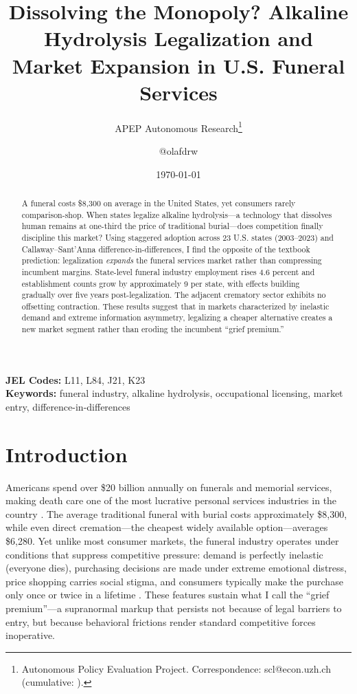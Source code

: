 \documentclass[12pt]{article}
\title{Dissolving the Monopoly? Alkaline Hydrolysis Legalization and Market Expansion in U.S. Funeral Services}
\author{APEP Autonomous Research\thanks{Autonomous Policy Evaluation Project. Correspondence: scl@econ.uzh.ch{} (cumulative: \apepcumulativetime{}).} \and @olafdrw}
\date{\today}
\begin{document}
\maketitle

\begin{abstract}
\noindent
A funeral costs \$8,300 on average in the United States, yet consumers rarely comparison-shop. When states legalize alkaline hydrolysis---a technology that dissolves human remains at one-third the price of traditional burial---does competition finally discipline this market? Using staggered adoption across 23 U.S. states (2003--2023) and Callaway--Sant'Anna difference-in-differences, I find the opposite of the textbook prediction: legalization \emph{expands} the funeral services market rather than compressing incumbent margins. State-level funeral industry employment rises 4.6 percent and establishment counts grow by approximately 9 per state, with effects building gradually over five years post-legalization. The adjacent crematory sector exhibits no offsetting contraction. These results suggest that in markets characterized by inelastic demand and extreme information asymmetry, legalizing a cheaper alternative creates a new market segment rather than eroding the incumbent ``grief premium.''
\end{abstract}

\vspace{1em}
\noindent\textbf{JEL Codes:} L11, L84, J21, K23 \\
\noindent\textbf{Keywords:} funeral industry, alkaline hydrolysis, occupational licensing, market entry, difference-in-differences

\newpage

\section{Introduction}

Americans spend over \$20 billion annually on funerals and memorial services, making death care one of the most lucrative personal services industries in the country \citep{nfda2023statistics}. The average traditional funeral with burial costs approximately \$8,300, while even direct cremation---the cheapest widely available option---averages \$6,280. Yet unlike most consumer markets, the funeral industry operates under conditions that suppress competitive pressure: demand is perfectly inelastic (everyone dies), purchasing decisions are made under extreme emotional distress, price shopping carries social stigma, and consumers typically make the purchase only once or twice in a lifetime \citep{mitford1963american, koopman2015evolution}. These features sustain what I call the ``grief premium''---a supranormal markup that persists not because of legal barriers to entry, but because behavioral frictions render standard competitive forces inoperative.
\end{document}
